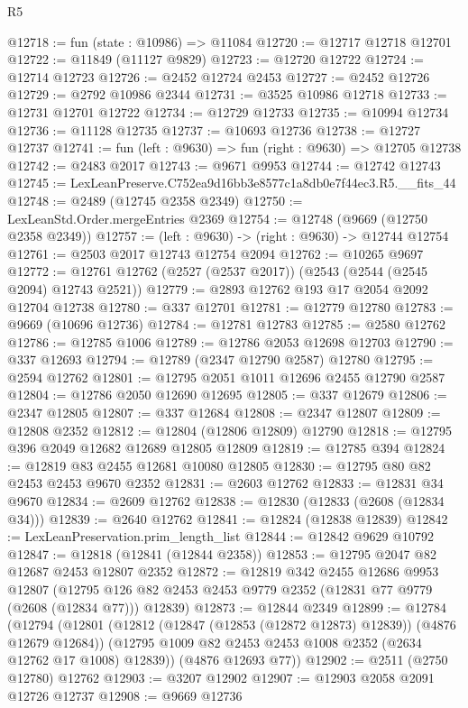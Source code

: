\begin{lexlean}{R5}
\begin{coremodule}
@12718 := fun (state : @10986) => @11084
@12720 := @12717 @12718 @12701
@12722 := @11849 (@11127 @9829)
@12723 := @12720 @12722
@12724 := @12714 @12723
@12726 := @2452 @12724 @2453
@12727 := @2452 @12726
@12729 := @2792 @10986 @2344
@12731 := @3525 @10986 @12718
@12733 := @12731 @12701 @12722
@12734 := @12729 @12733
@12735 := @10994 @12734
@12736 := @11128 @12735
@12737 := @10693 @12736
@12738 := @12727 @12737
@12741 := fun (left : @9630) => fun (right : @9630) => @12705 @12738
@12742 := @2483 @2017
@12743 := @9671 @9953
@12744 := @12742 @12743
@12745 := LexLeanPreserve.C752ea9d16bb3e8577c1a8db0e7f44ec3.R5.__fits_44
@12748 := @2489 (@12745 @2358 @2349)
@12750 := LexLeanStd.Order.mergeEntries @2369
@12754 := @12748 (@9669 (@12750 @2358 @2349))
@12757 := (left : @9630) -> (right : @9630) -> @12744 @12754
@12761 := @2503 @2017 @12743 @12754 @2094
@12762 := @10265 @9697
@12772 := @12761 @12762 (@2527 (@2537 @2017)) (@2543 (@2544 (@2545 @2094) @12743 @2521))
@12779 := @2893 @12762 @193 @17 @2054 @2092 @12704 @12738
@12780 := @337 @12701
@12781 := @12779 @12780
@12783 := @9669 (@10696 @12736)
@12784 := @12781 @12783
@12785 := @2580 @12762
@12786 := @12785 @1006
@12789 := @12786 @2053 @12698 @12703
@12790 := @337 @12693
@12794 := @12789 (@2347 @12790 @2587) @12780
@12795 := @2594 @12762
@12801 := @12795 @2051 @1011 @12696 @2455 @12790 @2587
@12804 := @12786 @2050 @12690 @12695
@12805 := @337 @12679
@12806 := @2347 @12805
@12807 := @337 @12684
@12808 := @2347 @12807
@12809 := @12808 @2352
@12812 := @12804 (@12806 @12809) @12790
@12818 := @12795 @396 @2049 @12682 @12689 @12805 @12809
@12819 := @12785 @394
@12824 := @12819 @83 @2455 @12681 @10080 @12805
@12830 := @12795 @80 @82 @2453 @2453 @9670 @2352
@12831 := @2603 @12762
@12833 := @12831 @34 @9670
@12834 := @2609 @12762
@12838 := @12830 (@12833 (@2608 (@12834 @34)))
@12839 := @2640 @12762
@12841 := @12824 (@12838 @12839)
@12842 := LexLeanPreservation.prim_length_list
@12844 := @12842 @9629 @10792
@12847 := @12818 (@12841 (@12844 @2358))
@12853 := @12795 @2047 @82 @12687 @2453 @12807 @2352
@12872 := @12819
    @342
    @2455
    @12686
    @9953
    @12807
    (@12795 @126 @82 @2453 @2453 @9779 @2352 (@12831 @77 @9779 (@2608 (@12834 @77))) @12839)
@12873 := @12844 @2349
@12899 := @12784
    (@12794
      (@12801
        (@12812 (@12847 (@12853 (@12872 @12873) @12839)) (@4876 @12679 @12684))
        (@12795 @1009 @82 @2453 @2453 @1008 @2352 (@2634 @12762 @17 @1008) @12839))
      (@4876 @12693 @77))
@12902 := @2511 (@2750 @12780) @12762
@12903 := @3207 @12902
@12907 := @12903 @2058 @2091 @12726 @12737
@12908 := @9669 @12736

\end{coremodule}
\end{lexlean}
